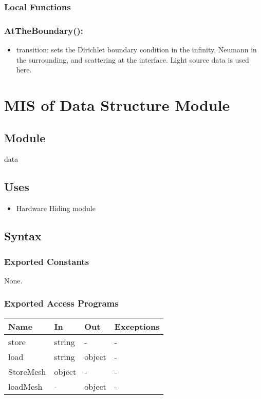 \documentclass[12pt, titlepage]{article}
\begin{document}
\subsubsection{Local Functions}

\subsubsection*{AtTheBoundary():}
\begin{itemize}
	\item transition: sets the Dirichlet boundary condition in the infinity, Neumann in the surrounding, and scattering at the interface. Light source data is used here.
	
\end{itemize}

\newpage
%
%
%
%
\section{MIS of Data Structure Module} \label{LSRM} 

\subsection{Module}
data

\subsection{Uses}
\begin{itemize}
\item Hardware Hiding module
\end{itemize}

\subsection{Syntax}

\subsubsection{Exported Constants}
None.
\subsubsection{Exported Access Programs}

\begin{center}
\begin{tabular}{p{2cm} p{4cm} p{4cm} p{2cm}}
	\hline
	\textbf{Name} & \textbf{In} & \textbf{Out} & \textbf{Exceptions} \\
	\hline
	store & string & - & - \\
	load & string & object & -\\
	StoreMesh & object & - & - \\
	loadMesh & - & object& - \\
	\hline
\end{tabular}
\end{center}
\end{document}

